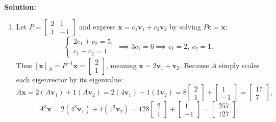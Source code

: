 \documentclass[11pt, letterpaper]{article}
\theoremstyle{definition}
\theoremstyle{remark}
\begin{document}
\textbf{Solution:}
\begin{enumerate}[label=(\alph*)]
    \item Let $P = \begin{bmatrix} 2 & 1 \\ 1 & -1 \end{bmatrix}$ and express $\mathbf{x} = c_{1}\mathbf{v}_{1} + c_{2}\mathbf{v}_{2}$ by solving $P\mathbf{c} = \mathbf{x}$:
    \[
    \begin{cases} 2c_{1} + c_{2} = 5, \\ c_{1} - c_{2} = 1 \end{cases}
    \implies 3c_{1} = 6 \implies c_{1} = 2,\ c_{2} = 1.
    \]
    Thus $[\mathbf{x}]_{\mathcal{B}} = P^{-1}\mathbf{x} = \begin{bmatrix} 2 \\ 1 \end{bmatrix}$, meaning $\mathbf{x} = 2\mathbf{v}_{1} + \mathbf{v}_{2}$. Because $A$ simply scales each eigenvector by its eigenvalue:
    \[
    A\mathbf{x} = 2(A\mathbf{v}_{1}) + 1(A\mathbf{v}_{2}) = 2(4\mathbf{v}_{1}) + 1(1\mathbf{v}_{2}) = 8\begin{bmatrix} 2 \\ 1 \end{bmatrix} + \begin{bmatrix} 1 \\ -1 \end{bmatrix} = \begin{bmatrix} 17 \\ 7 \end{bmatrix},
    \]
    \[
    A^{3}\mathbf{x} = 2(4^{3}\mathbf{v}_{1}) + 1(1^{3}\mathbf{v}_{2}) = 128\begin{bmatrix} 2 \\ 1 \end{bmatrix} + \begin{bmatrix} 1 \\ -1 \end{bmatrix} = \begin{bmatrix} 257 \\ 127 \end{bmatrix}.
    \]


\end{enumerate}
\end{document}
